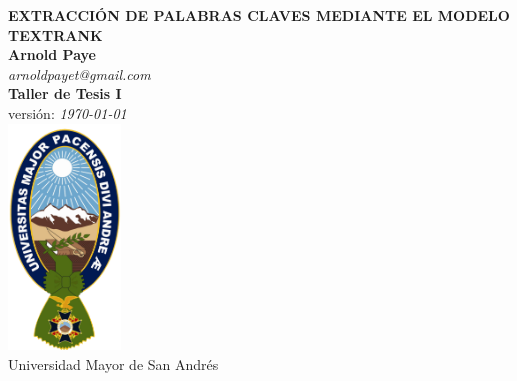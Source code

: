\begin{titlepage}
	\begin{center}
		{\huge\bfseries EXTRACCI\'ON DE PALABRAS CLAVES
		MEDIANTE EL MODELO TEXTRANK} \\
		\vspace{1.5cm}
		{\Large\bfseries Arnold Paye} \\ [5pt]
		\emph {arnoldpayet@gmail.com} \\[5pt]
		{\small\bfseries Taller de Tesis I} \\
		{\tiny versi\'on: \emph \today\ } \\
		\vspace{1.5cm}
		\includegraphics[width=3cm,height=6cm]{recursos/img/logo_umsa} \\
		{Universidad Mayor de San Andr\'es} 
	\end{center}
\end{titlepage}
